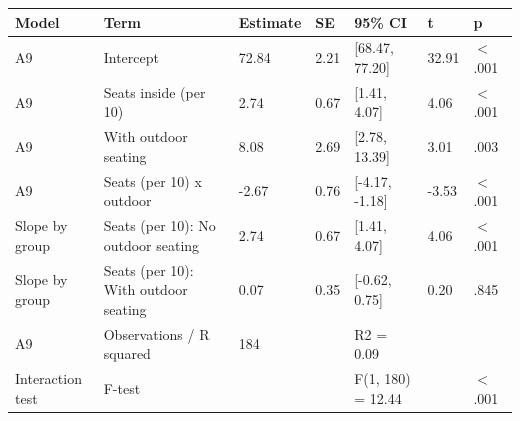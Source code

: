\begin{tabular}{lllllll}
  \toprule
Model & Term & Estimate & SE & 95\% CI & t & p \\ 
  \midrule
A9 & Intercept & 72.84 & 2.21 & [68.47, 77.20] & 32.91 & $<$ .001 \\ 
  A9 & Seats inside (per 10) & 2.74 & 0.67 & [1.41, 4.07] & 4.06 & $<$ .001 \\ 
  A9 & With outdoor seating & 8.08 & 2.69 & [2.78, 13.39] & 3.01 & .003 \\ 
  A9 & Seats (per 10) x outdoor & -2.67 & 0.76 & [-4.17, -1.18] & -3.53 & $<$ .001 \\ 
  Slope by group & Seats (per 10): No outdoor seating & 2.74 & 0.67 & [1.41, 4.07] & 4.06 & $<$ .001 \\ 
  Slope by group & Seats (per 10): With outdoor seating & 0.07 & 0.35 & [-0.62, 0.75] & 0.20 & .845 \\ 
  A9 & Observations / R squared & 184 &  & R2 = 0.09 &  &  \\ 
  Interaction test & F-test &  &  & F(1, 180) = 12.44 &  & $<$ .001 \\ 
   \bottomrule
\end{tabular}
